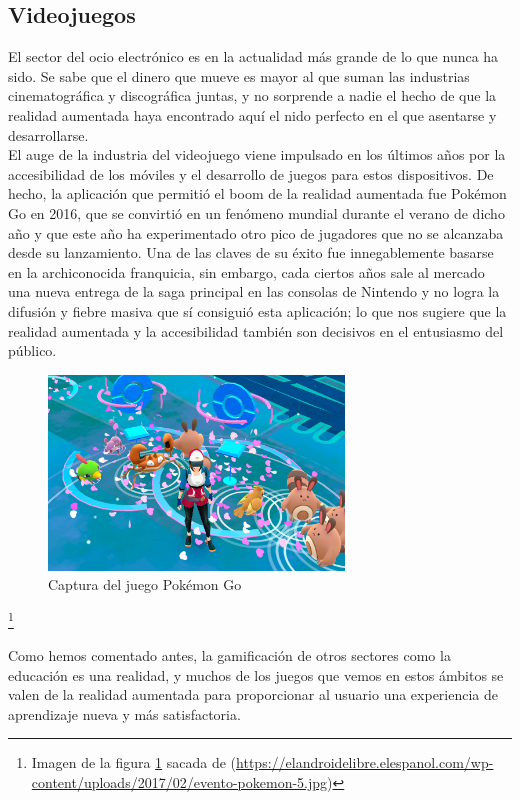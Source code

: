 \subsection{Videojuegos}
El sector del ocio electrónico es en la actualidad más grande de lo que nunca ha sido. Se sabe que el dinero que mueve es mayor al que suman las industrias cinematográfica y discográfica juntas, y no sorprende a nadie el hecho de que la realidad aumentada haya encontrado aquí el nido perfecto en el que asentarse y desarrollarse.\\

El auge de la industria del videojuego viene impulsado en los últimos años por la accesibilidad de los móviles y el desarrollo de juegos para estos dispositivos. De hecho, la aplicación que permitió el boom de la realidad aumentada fue Pokémon Go en 2016, que se convirtió en un fenómeno mundial durante el verano de dicho año y que este año ha experimentado otro pico de jugadores que no se alcanzaba desde su lanzamiento. Una de las claves de su éxito fue innegablemente basarse en la archiconocida franquicia, sin embargo, cada ciertos años sale al mercado una nueva entrega de la saga principal en las consolas de Nintendo y no logra la difusión y fiebre masiva que sí consiguió esta aplicación; lo que nos sugiere que la realidad aumentada y la accesibilidad también son decisivos en el entusiasmo del público.\\

\begin{figure}[H]
     \centering
     \includegraphics[width=0.7\textwidth]{Images/evento-pokemon-5.jpg}
     \caption{Captura del juego Pokémon Go}
     \label{fig:pokemonGo}
 \end{figure}
 {\let\thefootnote\relax\footnote{{Imagen de la figura \ref{fig:pokemonGo} sacada de (\url{https://elandroidelibre.elespanol.com/wp-content/uploads/2017/02/evento-pokemon-5.jpg})}}}

Como hemos comentado antes, la gamificación de otros sectores como la educación es una realidad, y muchos de los juegos que vemos en estos ámbitos se valen de la realidad aumentada para proporcionar al usuario una experiencia de aprendizaje nueva y más satisfactoria.\\


